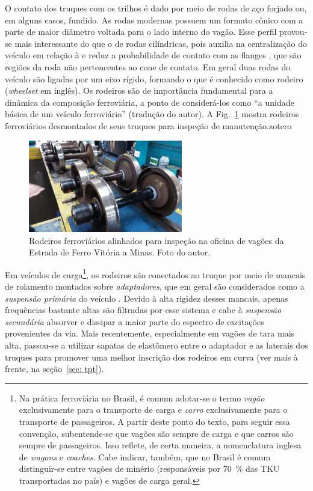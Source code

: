 O contato dos truques com os trilhos é dado por meio de rodas de aço forjado ou, em alguns casos, fundido. As rodas modernas possuem um formato cônico com a parte de maior diâmetro voltada para o lado interno do vagão. Esse perfil provou-se mais interessante do que o de rodas cilíndricas, pois auxilia na centralização do veículo em relação à e reduz a probabilidade de contato com as flanges \cite{shabana_computer_1998}, que são regiões da roda não pertencentes ao cone de contato. Em geral duas rodas do veículo são ligadas por um eixo rígido, formando o que é conhecido como rodeiro (\textit{wheelset} em inglês). Os rodeiros são de importância fundamental para a dinâmica da composição ferroviária, a ponto de  considerá-los como ``a unidade básica de um veículo ferroviário'' (tradução do autor). A Fig.~\ref{fig: rodeiros ferroviários} mostra rodeiros ferroviários desmontados de seus truques para inspeção de manutenção.zotero

\begin{figure}
    \centering
    \includegraphics[width=0.6\textwidth]{Cap_2/Figuras/foto_rodeiros_vale.jpg}
    \caption{Rodeiros ferroviários alinhados para inspeção na oficina de vagões da Estrada de Ferro Vitória a Minas. Foto do autor.}
    \label{fig: rodeiros ferroviários}
\end{figure}

Em veículos de carga\footnote{Na prática ferroviária no Brasil, é comum adotar-se o termo \textit{vagão} exclusivamente para o transporte de carga e \textit{carro} exclusivamente para
o transporte de passageiros. A partir deste ponto do texto, para seguir essa convenção, subentende-se que vagões são sempre de carga e que carros são sempre de passageiros. Isso reflete, de certa maneira, a nomenclatura inglesa de \textit{wagons} e \textit{coaches}. Cabe indicar, também, que no Brasil é comum distinguir-se entre vagões de minério (responsáveis por \SI{70}{\percent} das TKU transportadas no país) e vagões de carga geral.}, os rodeiros são conectados ao truque por meio de mancais de rolamento montados sobre \textit{adaptadores}, que em geral são considerados como a \textit{suspensão primária} do veículo . Devido à alta rigidez desses mancais, apenas frequências bastante altas são filtradas por esse sistema e cabe à \textit{suspensão secundária} absorver e dissipar a maior parte do espectro de excitações provenientes da via. Mais recentemente, especialmente em vagões de tara mais alta, passou-se a utilizar sapatas de elastômero entre o adaptador e as laterais dos truques para promover uma melhor inscrição dos rodeiros em curva (ver mais à frente, na seção~\ref{sec: tpt}).

